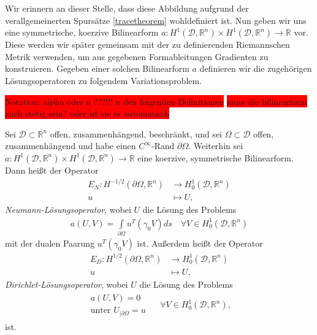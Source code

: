 Wir erinnern an dieser Stelle, dass diese Abbildung aufgrund der verallgemeinerten Spursätze \ref{tracetheorem} wohldefiniert ist. Nun geben wir uns eine symmetrische, koerzive Bilinearform $a: H^1(\mathcal{D}, \mathbb{R}^n)\times H^1(\mathcal{D}, \mathbb{R}^n) \rightarrow \mathbb{R}$ vor. Diese werden wir später gemeinsam mit der zu definierenden Riemannschen Metrik verwenden, um aus gegebenen Formableitungen Gradienten zu konstruieren. Gegeben einer solchen Bilinearform $a$ definieren wir die zugehörigen Lösungsoperatoren zu folgendem Variationsproblem.

\colorbox{red}{Notation: alpha oder u ???!!! n den folgenden Definitionen} \newline
\colorbox{red}{muss die bilinearform auch stetig sein? oder ist sie es automatisch}

\begin{defi}[Lösungsoperatoren]\label{Llsgsoperatoren}
Sei $\mathcal{D}\subset\mathbb{R}^n$ offen, zusammenhängend, beschränkt, und sei $\Omega\subset \mathcal{D}$ offen, zusammenhängend und habe einen $C^\infty$-Rand $\partial\Omega$.
Weiterhin sei $a: H^1(\mathcal{D}, \mathbb{R}^n)\times H^1(\mathcal{D}, \mathbb{R}^n) \rightarrow \mathbb{R}$ eine koerzive, symmetrische Bilinearform. Dann heißt der Operator 
\begin{align*}
	E_N: H^{-1/2}(\partial\Omega, \mathbb{R}^n) &\rightarrow H^{1}_0(\mathcal{D}, \mathbb{R}^n) \\
	u &\mapsto U,
\end{align*}
\textit{Neumann-Lösungsoperator}, wobei $U$ die Lösung des Problems
\begin{align*}
	a(U,V) = \underset{\partial\Omega}{\int}u^T(\gamma_0 V)ds \quad \forall V \in H^1_0(\mathcal{D},\mathbb{R}^n)
\end{align*}
mit der dualen Paarung $u^T(\gamma_0 V)$ ist. Außerdem heißt der Operator
\begin{align*}
	E_D: H^{1/2}(\partial\Omega, \mathbb{R}^n) &\rightarrow H^{1}_0(\mathcal{D}, \mathbb{R}^n) \\
	u &\mapsto U,
\end{align*}
\textit{Dirichlet-Lösungsoperator}, wobei $U$ die Lösung des Problems
\begin{align*}
	\begin{matrix} a(U,V) = 0 \\
	\text{unter } U_{\vert \partial\Omega} = u 
	\end{matrix} \quad\; \forall V \in H^1_0(\mathcal{D},\mathbb{R}^n),
\end{align*}
ist.
\end{defi}


